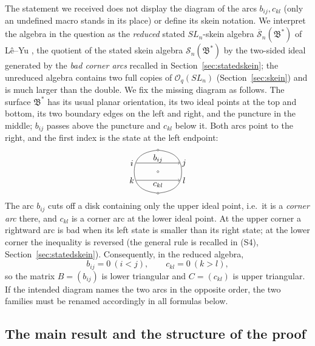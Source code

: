 \documentclass[11pt]{article}
\theoremstyle{remark}
\newcommand{\Skein}{\mathcal S_n}
\newcommand{\redS}{\overline{\mathcal S}_n}
\newcommand{\Bstar}{\mathfrak B^*}
\newcommand{\Oq}{\mathcal O_q(SL_n)}
\begin{document}
The statement we received does not display the diagram of the arcs
$b_{ij},c_{kl}$ (only an undefined macro stands in its place) or
define its skein notation. We interpret the algebra in the question as
the \emph{reduced} stated $SL_n$-skein algebra $\redS(\Bstar)$ of
L\^e--Yu \cite[Section 7.1]{LY}, the quotient of the stated skein
algebra $\Skein(\Bstar)$ by the two-sided ideal generated by the
\emph{bad corner arcs} recalled in Section~\ref{sec:statedskein}; the
unreduced algebra contains two full copies of $\Oq$
(Section~\ref{sec:skein}) and is much larger than the double.
We fix the missing diagram as follows. The surface $\Bstar$ has its
usual planar orientation, its two ideal points at the top and bottom,
its two boundary edges on the left and right, and the puncture in the
middle; $b_{ij}$ passes above the puncture and $c_{kl}$ below it. Both
arcs point to the right, and the first index is the state at the left
endpoint:
\[
\begin{tikzpicture}[baseline=0,scale=0.6]
  \draw (-1.65,0) .. controls (-1.65,1.25) and (-0.7,1.4) .. (0,1.5);
  \draw (0,1.5) .. controls (0.7,1.4) and (1.65,1.25) .. (1.65,0);
  \draw (-1.65,0) .. controls (-1.65,-1.25) and (-0.7,-1.4) .. (0,-1.5);
  \draw (0,-1.5) .. controls (0.7,-1.4) and (1.65,-1.25) .. (1.65,0);
  \filldraw[fill=white] (0,1.5) circle (0.06);
  \filldraw[fill=white] (0,-1.5) circle (0.06);
  \filldraw[fill=white] (0,0) circle (0.065);
  \draw[->] (-1.52,0.6) -- (1.52,0.6);
  \draw[->] (-1.52,-0.6) -- (1.52,-0.6);
  \node at (-1.82,0.6) {$i$};
  \node at (1.82,0.6) {$j$};
  \node at (-1.82,-0.6) {$k$};
  \node at (1.82,-0.6) {$l$};
  \node at (0,0.91) {$b_{ij}$};
  \node at (0,-0.91) {$c_{kl}$};
\end{tikzpicture}
\]
The arc $b_{ij}$ cuts off a disk containing only the upper ideal
point, i.e.\ it is a \emph{corner arc} there, and $c_{kl}$ is a corner
arc at the lower ideal point. At the upper corner a rightward arc
is bad when its left state is smaller than its right state; at the
lower corner the inequality is reversed (the general rule is recalled
in (S4), Section~\ref{sec:statedskein}). Consequently, in the reduced
algebra,
\[
 b_{ij}=0\ (i<j),\qquad c_{kl}=0\ (k>l),
\]
so the matrix $B=(b_{ij})$ is lower triangular and $C=(c_{kl})$ is
upper triangular. If the intended diagram names the two arcs in the
opposite order, the two families must be renamed accordingly in all
formulas below.

\subsection{The main result and the structure of the proof}\label{sec:strategy}
\end{document}
